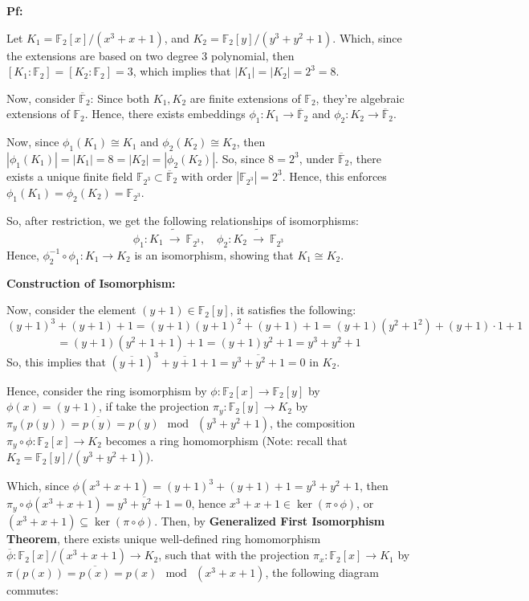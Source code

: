 \documentclass{article}
\begin{document}
\textbf{Pf:}

Let $K_1=\mathbb{F}_2[x]/(x^3+x+1)$, and $K_2=\mathbb{F}_2[y]/(y^3+y^2+1)$. Which, since the extensions are based on two degree $3$ polynomial, then $[K_1:\mathbb{F}_2]=[K_2:\mathbb{F}_2]=3$, which implies that $|K_1| = |K_2| = 2^3=8$.

Now, consider $\overline{\mathbb{F}}_2$: Since both $K_1,K_2$ are finite extensions of $\mathbb{F}_2$, they're algebraic extensions of $\mathbb{F}_2$. Hence, there exists embeddings $\phi_1:K_1\rightarrow \overline{\mathbb{F}}_2$ and $\phi_2:K_2\rightarrow\overline{\mathbb{F}}_2$.

Now, since $\phi_1(K_1)\cong K_1$ and $\phi_2(K_2)\cong K_2$, then $|\phi_1(K_1)|=|K_1|=8=|K_2|=|\phi_2(K_2)|$. So, since $8=2^3$, under $\overline{\mathbb{F}}_2$, there exists a unique finite field $\mathbb{F}_{2^3}\subset\overline{\mathbb{F}}_2$ with order $|\mathbb{F}_{2^3}|=2^3$. Hence, this enforces $\phi_1(K_1)=\phi_2(K_2)=\mathbb{F}_{2^3}$.

So, after restriction, we get the following relationships of isomorphisms:
$$\phi_1:K_1\ \tilde{\rightarrow}\ \mathbb{F}_{2^3},\quad \phi_2:K_2\ \tilde{\rightarrow}\ \mathbb{F}_{2^3}$$
Hence, $\phi_2^{-1}\circ \phi_1:K_1\rightarrow K_2$ is an isomorphism, showing that $K_1\cong K_2$.

\hfil

\textbf{Construction of Isomorphism:}

Now, consider the element $(y+1)\in \mathbb{F}_2[y]$, it satisfies the following:
$$(y+1)^3+(y+1)+1 = (y+1)(y+1)^2+(y+1)+1 = (y+1)(y^2+1^2)+(y+1)\cdot 1+1$$
$$ = (y+1)(y^2+1+1)+1 = (y+1)y^2 + 1 = y^3+y^2+1$$
So, this implies that $(\overline{y+1})^3+\overline{y+1}+1 = \overline{y^3+y^2+1}= 0$ in $K_2$.

Hence, consider the ring isomorphism by $\phi:\mathbb{F}_2[x]\rightarrow\mathbb{F}_2[y]$ by $\phi(x)=(y+1)$, if take the projection $\pi_y:\mathbb{F}_2[y]\rightarrow K_2$ by $\pi_y(p(y))=\overline{p(y)}=p(y)\mod\ (y^3+y^2+1)$, the composition $\pi_y\circ\phi:\mathbb{F}_2[x]\rightarrow K_2$ becomes a ring homomorphism (Note: recall that $K_2=\mathbb{F}_2[y]/(y^3+y^2+1)$).

Which, since $\phi(x^3+x+1)=(y+1)^3+(y+1)+1 = y^3+y^2+1$, then $\pi_y\circ\phi(x^3+x+1)=\overline{y^3+y^2+1}=0$, hence $x^3+x+1\in \ker(\pi\circ\phi)$, or $(x^3+x+1)\subseteq \ker(\pi\circ\phi)$. Then, by \textbf{Generalized First Isomorphism Theorem}, there exists unique well-defined ring homomorphism $\overline{\phi}:\mathbb{F}_2[x]/(x^3+x+1)\rightarrow K_2$, such that with the projection $\pi_x:\mathbb{F}_2[x]\rightarrow K_1$ by $\pi(p(x))=\overline{p(x)}=p(x)\mod\ (x^3+x+1)$, the following diagram commutes:
\end{document}
